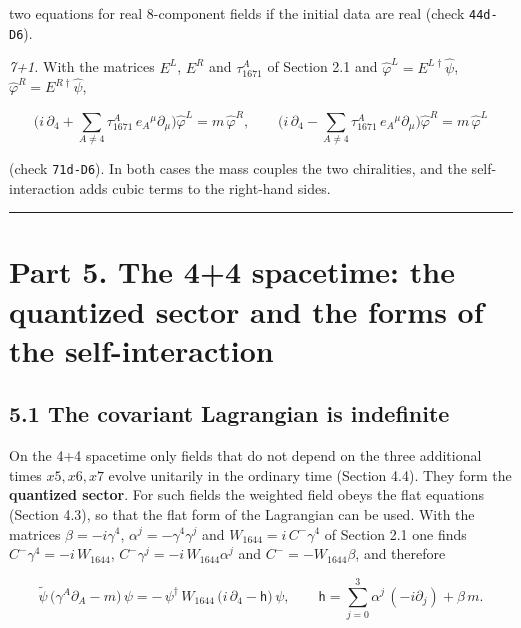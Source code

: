 \documentclass[
  10pt,
]{article}
\begin{document}
two equations for real 8-component fields if the initial data are real
(check \texttt{44d-D6}).

\emph{7+1.} With the matrices \(E^L\), \(E^R\) and \(\tau_{1671}^A\) of
Section 2.1 and \(\hat\varphi^{L}=E^{L\dagger}\hat\psi\),
\(\hat\varphi^{R}=E^{R\dagger}\hat\psi\),

\[\Big(i\,\partial_4+\sum_{A\neq4}\tau_{1671}^A\,e_A{}^\mu\partial_\mu\Big)\hat\varphi^L=m\,\hat\varphi^R,\qquad
\Big(i\,\partial_4-\sum_{A\neq4}\tau_{1671}^A\,e_A{}^\mu\partial_\mu\Big)\hat\varphi^R=m\,\hat\varphi^L\tag{4.15}\]

(check \texttt{71d-D6}). In both cases the mass couples the two
chiralities, and the self-interaction adds cubic terms to the right-hand
sides.

\begin{center}\rule{0.5\linewidth}{0.5pt}\end{center}

\hypertarget{part-5.-the-44-spacetime-the-quantized-sector-and-the-forms-of-the-self-interaction}{%
\section{Part 5. The 4+4 spacetime: the quantized sector and the forms
of the
self-interaction}\label{part-5.-the-44-spacetime-the-quantized-sector-and-the-forms-of-the-self-interaction}}

\hypertarget{the-covariant-lagrangian-is-indefinite}{%
\subsection{5.1 The covariant Lagrangian is
indefinite}\label{the-covariant-lagrangian-is-indefinite}}

On the 4+4 spacetime only fields that do not depend on the three
additional times \(x5,x6,x7\) evolve unitarily in the ordinary time
(Section 4.4). They form the \textbf{quantized sector}. For such fields
the weighted field obeys the flat equations (Section 4.3), so that the
flat form of the Lagrangian can be used. With the matrices
\(\beta=-i\gamma^4\), \(\alpha^j=-\gamma^4\gamma^j\) and
\(W_{1644}=i\,C^-\gamma^4\) of Section 2.1 one finds
\(C^-\gamma^4=-i\,W_{1644}\), \(C^-\gamma^j=-i\,W_{1644}\alpha^j\) and
\(C^-=-W_{1644}\beta\), and therefore

\[\tilde\psi\,\big(\gamma^A\partial_A-m\big)\,\psi=-\,\psi^\dagger\,W_{1644}\,\big(i\,\partial_4-\mathsf h\big)\,\psi,
\qquad\mathsf h=\sum_{j=0}^{3}\alpha^j\,(-i\partial_j)+\beta\,m.\tag{5.1}\]
\end{document}

